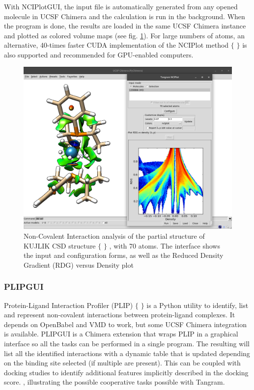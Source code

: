 With NCIPlotGUI, the input file is automatically generated from any opened molecule in UCSF Chimera and the calculation is run in the background. When the program is done, the results are loaded in the same UCSF Chimera instance and plotted as colored volume maps (see fig. \ref{fig:tangram-nciplot}). For large numbers of atoms, an alternative, 40-times faster CUDA implementation of the NCIPlot method $ \{ $ $ \} $  is also supported and recommended for GPU-enabled computers.



\begin{figure}
	\begin{Center}
		\includegraphics[width=\textwidth]{./figures/05/tangram_nciplot.png}
		\caption[Tangram NCIPlotGUI]{Non-Covalent Interaction analysis of the partial structure of KUJLIK CSD structure $ \{ $ $ \} $ , with 70 atoms. The interface shows the input and configuration forms, as well as the Reduced Density Gradient (RDG) versus Density plot}
		\label{fig:tangram-nciplot}
	\end{Center}
\end{figure}

\subsubsection{PLIPGUI}
Protein-Ligand Interaction Profiler (PLIP) $ \{ $ $ \} $  is a Python utility to identify, list and represent non-covalent interactions between protein-ligand complexes. It depends on OpenBabel and VMD to work, but some UCSF Chimera integration is available. PLIPGUI is a Chimera extension that wraps PLIP in a graphical interface so all the tasks can be performed in a single program. The resulting will list all the identified interactions with a dynamic table that is updated depending on the binding site selected (if multiple are present). This can be coupled with docking studies to identify additional features implicitly described in the docking score. , illustrating the possible cooperative tasks possible with Tangram.

